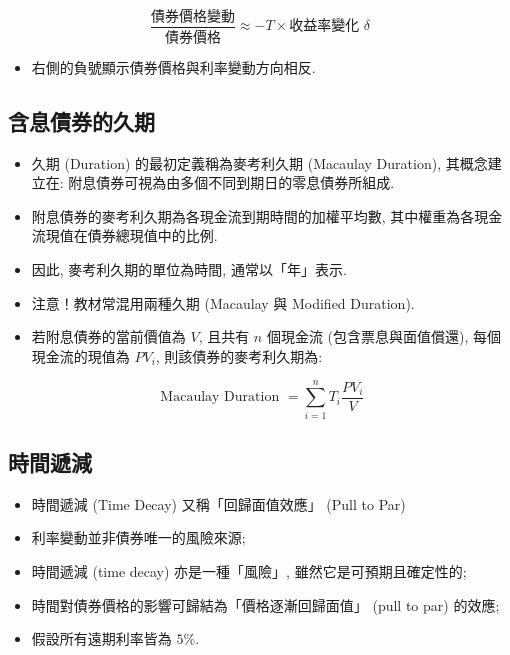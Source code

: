 \documentclass[letterpaper]{article}
\begin{document}
		$$
		\frac{\text{債券價格變動}}{\text{債券價格}} \approx -T \times \text{收益率變化 } \delta
		$$
		
		\begin{itemize}
			\item 右側的負號顯示債券價格與利率變動方向相反.  
		\end{itemize}
		
		
		\subsection{含息債券的久期}
		\begin{itemize}
			\item 久期 (Duration) 的最初定義稱為麥考利久期 (Macaulay Duration), 其概念建立在: 附息債券可視為由多個不同到期日的零息債券所組成.  
			\item 附息債券的麥考利久期為各現金流到期時間的加權平均數, 其中權重為各現金流現值在債券總現值中的比例.  
			\item 因此, 麥考利久期的單位為時間, 通常以「年」表示.  
			\item 注意！教材常混用兩種久期 (Macaulay 與 Modified Duration).  
			\item 若附息債券的當前價值為 $V$, 且共有 $n$ 個現金流 (包含票息與面值償還), 每個現金流的現值為 $PV_{i}$, 則該債券的麥考利久期為: 
		\end{itemize}
		
		
		$$
		\text { Macaulay Duration }=\sum_{i=1}^{n} T_{i} \frac{P V_{i}}{V}
		$$
		
		\subsection{時間遞減}
		\begin{itemize}
			\item 時間遞減 (Time Decay) 又稱「回歸面值效應」 (Pull to Par) 
			\item 利率變動並非債券唯一的風險來源; 
			\item 時間遞減 (time decay) 亦是一種「風險」, 雖然它是可預期且確定性的; 
			\item 時間對債券價格的影響可歸結為「價格逐漸回歸面值」 (pull to par) 的效應; 
			\item 假設所有遠期利率皆為 $5\%$.  
		\end{itemize}
		
\end{document}
